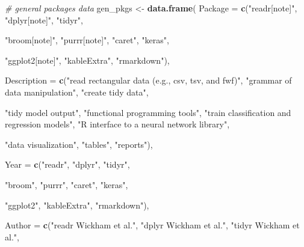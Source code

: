 \documentclass[10pt,letterpaper]{article}
\newenvironment{Shaded}{\begin{snugshade}}{\end{snugshade}}
\newcommand{\CommentTok}[1]{\textcolor[rgb]{0.56,0.35,0.01}{\textit{#1}}}
\newcommand{\DataTypeTok}[1]{\textcolor[rgb]{0.13,0.29,0.53}{#1}}
\newcommand{\KeywordTok}[1]{\textcolor[rgb]{0.13,0.29,0.53}{\textbf{#1}}}
\newcommand{\NormalTok}[1]{#1}
\newcommand{\StringTok}[1]{\textcolor[rgb]{0.31,0.60,0.02}{#1}}
\begin{document}
\begin{Shaded}
\begin{Highlighting}[]
\CommentTok{# general packages data}
\NormalTok{gen_pkgs <-}\StringTok{ }\KeywordTok{data.frame}\NormalTok{(}
  \DataTypeTok{Package =} \KeywordTok{c}\NormalTok{(}\StringTok{"readr[note]"}\NormalTok{, }
              \StringTok{"dplyr[note]"}\NormalTok{,}
              \StringTok{"tidyr"}\NormalTok{,}
              
              \StringTok{"broom[note]"}\NormalTok{,}
              \StringTok{"purrr[note]"}\NormalTok{,}
              \StringTok{"caret"}\NormalTok{, }
              \StringTok{"keras"}\NormalTok{, }
              
              \StringTok{"ggplot2[note]"}\NormalTok{, }
              \StringTok{"kableExtra"}\NormalTok{, }
              \StringTok{"rmarkdown"}\NormalTok{),}
  
  \DataTypeTok{Description =} \KeywordTok{c}\NormalTok{(}\StringTok{"read rectangular data (e.g., csv, tsv, and fwf)"}\NormalTok{, }
                  \StringTok{"grammar of data manipulation"}\NormalTok{,}
                  \StringTok{"create tidy data"}\NormalTok{,}
                  
                  \StringTok{"tidy model output"}\NormalTok{, }
                  \StringTok{"functional programming tools"}\NormalTok{,}
                  \StringTok{"train classification and regression models"}\NormalTok{, }
                  \StringTok{"R interface to a neural network library"}\NormalTok{, }
                  
                  \StringTok{"data visualization"}\NormalTok{, }
                  \StringTok{"tables"}\NormalTok{,}
                  \StringTok{"reports"}\NormalTok{),}
  
  \DataTypeTok{Year =} \KeywordTok{c}\NormalTok{(}\StringTok{"readr"}\NormalTok{,}
           \StringTok{"dplyr"}\NormalTok{,}
           \StringTok{"tidyr"}\NormalTok{,}
  
           \StringTok{"broom"}\NormalTok{,}
           \StringTok{"purrr"}\NormalTok{,}
           \StringTok{"caret"}\NormalTok{, }
           \StringTok{"keras"}\NormalTok{,}
                    
           \StringTok{"ggplot2"}\NormalTok{,}
           \StringTok{"kableExtra"}\NormalTok{, }
           \StringTok{"rmarkdown"}\NormalTok{),}
  
  \DataTypeTok{Author =} \KeywordTok{c}\NormalTok{(}\StringTok{"readr Wickham et al."}\NormalTok{,}
             \StringTok{"dplyr Wickham et al."}\NormalTok{, }
             \StringTok{"tidyr Wickham et al."}\NormalTok{,}
  

\end{Highlighting}
\end{Shaded}
\end{document}
